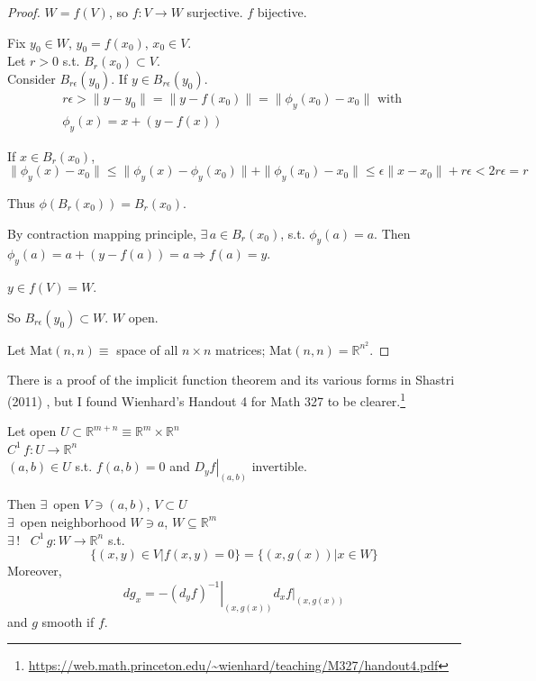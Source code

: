 \begin{proof}
$W=f(V)$, so $f:V\to W$ surjective.  $f$ bijective.  

Fix $y_0 \in W$, $y_0 = f(x_0)$, $x_0 \in V$.  \\
Let $r>0$ s.t. $B_r(x_0) \subset V$.  \\
Consider $B_{r\epsilon}(y_0)$.  If $y\in B_{r\epsilon}(y_0)$.  
\[
\begin{gathered}
  r\epsilon > \| y-y_0 \| = \| y - f(x_0) \| = \| \phi_y(x_0) - x_0 \| \text{ with } \\
  \phi_y(x) = x + (y-f(x))
\end{gathered}
\]

If $x\in B_r(x_0)$, 
\[
\| \phi_y(x) -x_0 \| \leq \| \phi_y(x) - \phi_y(x_0) \|  + \| \phi_y(x_0) - x_0 \| \leq \epsilon \| x-x_0 \| + r\epsilon < 2 r\epsilon = r
\]



Thus $\phi(B_r(x_0)) = B_r(x_0)$.

By contraction mapping principle, $\exists \, a \in B_r(x_0)$, s.t. $\phi_y(a)=a$.  Then $\phi_y(a) = a+ (y-f(a)) = a \Longrightarrow f(a) =y$.  

$y\in f(V) = W$.  

So $B_{r\epsilon}(y_0) \subset W$.  $W$ open.  

Let $\text{Mat}(n,n) \equiv $ space of all $n\times n$ matrices; $\text{Mat}(n,n)  = \mathbb{R}^{n^2}$.  


\end{proof}

There is a proof of the implicit function theorem and its various forms in Shastri (2011) \cite{dgdt:AShastri2011}, but I found Wienhard's Handout 4 for Math 327 to be clearer.\footnote{\url{https://web.math.princeton.edu/~wienhard/teaching/M327/handout4.pdf}}

\begin{theorem}
Let open $U \subset \mathbb{R}^{m+n} \equiv \mathbb{R}^m \times \mathbb{R}^n$  \\
\phantom{Let} $C^1 \, f:U \to \mathbb{R}^n $ \\
\phantom{Let} $(a,b) \in U$ s.t. $f(a,b) = 0$ and $\left. D_y f\right|_{(a,b)}$ invertible.  

Then $\exists \, $ open $V \ni (a,b)$, $V \subset U$ \\
\phantom{Then} $\exists \, $ open neighborhood $W \ni a$, $W \subseteq \mathbb{R}^m$ \\
\phantom{Then} $\exists \, !$ \, $C^1 \, g:W \to \mathbb{R}^n$ s.t.
\[
\lbrace (x,y) \in V | f(x,y) =0 \rbrace = \lbrace (x,g(x)) | x \in W \rbrace
\]
Moreover,
\[
dg_x = - \left. (d_yf)^{-1} \right|_{(x,g(x))} \left. d_x f\right|_{(x,g(x))}
\]
and $g$ smooth if $f$.  
\end{theorem}

